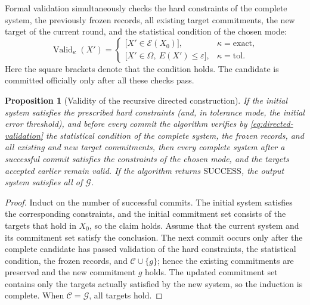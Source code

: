 \documentclass[11pt,a4paper]{article}
\numberwithin{equation}{section}
\newtheorem{proposition}{Proposition}[section]
\theoremstyle{definition}
\numberwithin{algorithm}{section}
\begin{document}
Formal validation simultaneously checks the hard constraints of the complete system, the
previously frozen records, all existing target commitments, the new target of the current
round, and the statistical condition of the chosen mode:
\begin{equation}
\operatorname{Valid}_{\kappa}(X')=
\begin{cases}
\bigl[X'\in\mathcal E(X_0)\bigr],&
\kappa=\mathrm{exact},\\
\bigl[X'\in\Omega,\ E(X')\le\varepsilon\bigr],&
\kappa=\mathrm{tol}.
\end{cases}
\label{eq:directed-validation}
\end{equation}
Here the square brackets denote that the condition holds.
The candidate is committed officially only after all these checks pass.


\begin{proposition}[Validity of the recursive directed construction]
\label{prop:directed-validity}
If the initial system satisfies the prescribed hard constraints (and, in tolerance mode, the
initial error threshold), and before every commit the algorithm verifies by
\eqref{eq:directed-validation} the statistical condition of the complete system, the frozen
records, and all existing and new target commitments, then every complete system after a
successful commit satisfies the constraints of the chosen mode, and the targets accepted
earlier remain valid.
If the algorithm returns $\mathrm{SUCCESS}$, the output system satisfies all of $\mathcal G$.
\end{proposition}
\begin{proof}
Induct on the number of successful commits.
The initial system satisfies the corresponding constraints, and the initial commitment set
consists of the targets that hold in $X_0$, so the claim holds.
Assume that the current system and its commitment set satisfy the conclusion.
The next commit occurs only after the complete candidate has passed validation of the hard
constraints, the statistical condition, the frozen records, and $\mathcal C\cup\{g\}$;
hence the existing commitments are preserved and the new commitment $g$ holds.
The updated commitment set contains only the targets actually satisfied by the new system,
so the induction is complete.
When $\mathcal C=\mathcal G$, all targets hold.
\end{proof}
\end{document}
